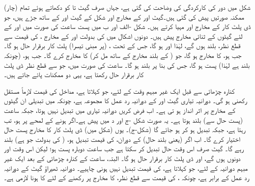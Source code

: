 شکل  میں دور کی کارکردگی کی وضاحت کی گئی ہے، جہاں صرف گیٹ  تا  کو دکھاتے ہوئے تمام (چار) ممکنہ صورتیں پیش کی گئی ہیں۔گیٹ  اور  کے مخارج  اور  شکل  کے گیٹ  اور  کے ساتھ جڑے ہیں، جو ڈی پلٹ کار کے مخارج  اور  مہیا کرتے ہیں۔ شکل  -الف اور ب میں پست ساعت  کی صورت میں  اور  کے لئے گیٹوں کے ثنائی مخارج پیش ہیں۔ دونوں اشکال میں  کی بدولت  اور  کے مخارج ،  کی قیمت سے قطع نظر، بلند ہوں گے، لہٰذا  اور  ہو گا، جس کے تحت ، (پر مبنی تیسرا) پلٹ کار برقرار حال ہو گا۔ جب  ہو،  کا مخارج  ہو گا، جو ( کے بلند مخارج کے ساتھ مل کر)  کا مخارج  کرے گا۔ جب  ہو، (چونکہ  بلند ہے لہٰذا) پست  ہو گا، جس کی بنا پر  بلند  ہو گا۔ ساعت  کی صورت میں، جو  سے قطع نظر ڈی پلٹ کار برقرار حال رکھتا ہے، یہی دو ممکنات پائے جاتے ہیں۔


کنارہ چڑھائی سے قبل ایک غیر مبہم وقت کے لئے، جو  کہلاتا ہے، مداخل  کی قیمت لازماً مستقل رکھنی ہو گی۔ دورانیہ تیاری گیٹ  اور  کے دورانیہ رد عمل کا مجموعہ ہے، چونکہ  میں تبدیلی ان گیٹوں کے مخارج پر اثر انداز ہو تی ہے۔ اب فرض کریں دورانیہ تیاری میں  تبدیل نہیں ہوتا، جبکہ ساعت (پست حال سے) بلند  ہوتا ہے۔ یہ صورت شکل -ج اور د میں پیش ہے۔اگر  ہونے کے لمحے پر  ہو، تب  رہتا ہے، جبکہ  تبدیل ہو کر  ہو جائے گا (شکل-ج)۔ یوں (شکل  میں) ڈی پلٹ کار کا مخارج  پست  حال اختیار کرے گا۔ اب اگر  (یعنی بلند حال) کے دوران،  کی قیمت تبدیل ہو، ( کی بدولت جو  ہے)  بلند  رہے گا۔ گیٹ  صرف اس وقت حال تبدیل کر سکتا ہے جب ساعت دوبارہ پست  ہو؛ لیکن اس وقت  اور  دونوں  ہوں گے، اور ڈی پلٹ کار برقرار حال ہو گا۔ البتہ، ساعت کے کنارہ چڑھائی کے بعد ایک غیر مبہم دورانیہ کے لئے، جو  کہلاتا ہے،  کی قیمت تبدیل نہیں ہونی چاہیے۔ دورانیہ ٹھیراؤ گیٹ  کے دورانیہ رد عمل کے برابر ہے، چونکہ ،  کی قیمت سے قطع نظر،  کا مخارج  پر رکھنے کے لئے  کا  ہونا لازمی ہے۔
 
